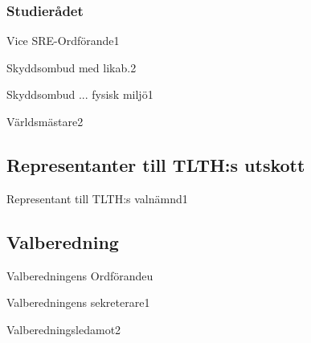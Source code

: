 \documentclass[10pt]{article}
\begin{document}
    \subsubsection{Studierådet}
    \begin{vallista}
        \begin{post}{Vice SRE-Ordförande}{1}
            \vakant
        \end{post}
        \begin{post}{Skyddsombud med likab.}{2}
        \end{post}
        \begin{post}{Skyddsombud ... fysisk miljö}{1}
            \vakant
        \end{post}
        \newpage
        \begin{post}{Världsmästare}{2}
        \end{post}
    \end{vallista}
    
    \subsection{Representanter till TLTH:s utskott}
    \begin{vallista}
        \begin{post}{Representant till TLTH:s valnämnd}{1}
        \end{post}
    \end{vallista}

    \subsection{Valberedning}
    \begin{vallista}
        \begin{post}{Valberedningens Ordförande}{u}
        \end{post}
        \begin{post}{Valberedningens sekreterare}{1}
            \vakant
        \end{post}
        \begin{post}{Valberedningsledamot}{2}
        \end{post}
    \end{vallista}
    
\end{document}
